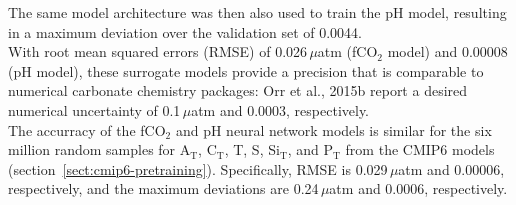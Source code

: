 \documentclass{article}
\begin{document}
	The same model architecture was then also used to train the pH model, resulting in a maximum deviation over the validation set of 0.0044. \\
	With root mean squared errors (RMSE) of 0.026\,$\mu$atm (fCO$_2$ model) and 0.00008 (pH model), these surrogate models provide a precision that is comparable to numerical carbonate chemistry packages: Orr et al., 2015b report a desired numerical uncertainty of 0.1\,$\mu$atm and 0.0003, respectively. \\
	The accurracy of the fCO$_2$ and pH neural network models is similar for the six million random samples for A$_\text{T}$, C$_\text{T}$, T, S, Si$_\text{T}$, and P$_\text{T}$ from the CMIP6 models (section~\ref{sect:cmip6-pretraining}). Specifically, RMSE is 0.029\,$\mu$atm and 0.00006, respectively, and the maximum deviations are 0.24\,$\mu$atm and 0.0006, respectively.     
	
\end{document}
